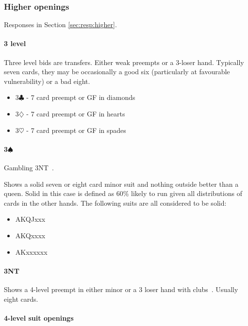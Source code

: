 \documentclass[a4paper,14pt]{extarticle}
\begin{document}
\subsubsection{Higher openings}
\label{sec:open:higher}

Responses in Section \ref{sec:resp:higher}.

\paragraph{3 level}

Three level bids are transfers. Either weak preempts or a 3-loser hand.
Typically seven cards, they may be occasionally a good six (particularly at
favourable vulnerability) or a bad eight.

\begin{itemize}
\item 3$\clubsuit$ - 7 card preempt or GF in diamonds 
\item 3$\diamondsuit$ - 7 card preempt or GF in hearts 
\item 3$\heartsuit$ - 7 card preempt or GF in spades 
\end{itemize}

\paragraph{3$\spadesuit$}

Gambling 3NT~. 

Shows a solid seven or eight card minor suit and nothing outside better than a
queen.  Solid in this case is defined as 60\% likely to run given all
distributions of cards in the other hands. The following suits are all
considered to be solid:

\begin{itemize}
\item AKQJxxx
\item AKQxxxx
\item AKxxxxxx
\end{itemize}

\paragraph{3NT}

Shows a 4-level preempt in either minor or a 3 loser hand with
clubs~. Usually eight cards. 

\paragraph{4-level suit openings}
\end{document}
